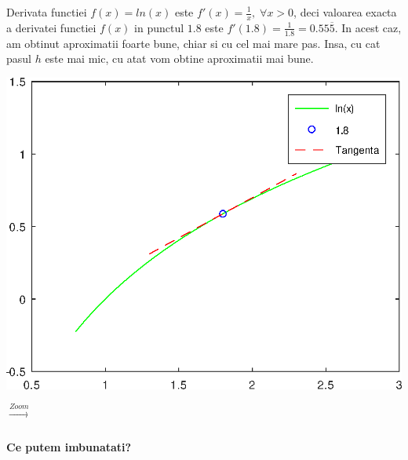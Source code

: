 \documentclass{article}
\begin{document}
\tabto{0.5cm} Derivata functiei $f(x) = ln(x)$ este $f'(x) = \frac{1}{x},\; \forall x > 0$, deci valoarea exacta a derivatei functiei $f(x)$ in punctul $1.8$ este $f'(1.8) = \frac{1}{1.8} = 0.55\overline{5}$. In acest caz, am obtinut aproximatii foarte bune, chiar si cu cel mai mare pas. Insa, cu cat pasul $h$ este mai mic, cu atat vom obtine aproximatii mai bune.\\

\begin{minipage}{0.4\textwidth}
    \includegraphics[scale=0.45]{two_points_ex}
\end{minipage}
{\LARGE$\xrightarrow[]{Zoom}$}\;\;\;\;\;
\begin{minipage}{0.65\textwidth}
\end{minipage}

\paragraph{Ce putem imbunatati?}
\end{document}
